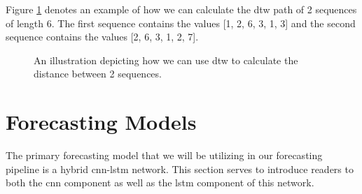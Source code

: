 \noindent Figure \ref{fig:DTW-Illustration} denotes an example of how we can calculate the \gls{dtw} path of 2 sequences of length 6. The first sequence contains the values [1, 2, 6, 3, 1, 3] and the second sequence contains the values [2, 6, 3, 1, 2, 7].

\begin{figure}[hbt!]
        \begin{adjustwidth*}{-0.5cm}{-0.5cm}%
                \myfloatalign
                 \quad
                 \quad
                \caption{An illustration depicting how we can use \gls{dtw} to calculate the distance between 2 sequences.}
                \label{fig:DTW-Illustration}
        \end{adjustwidth*}
\end{figure}

\section{Forecasting Models}
\label{sec:Background-Information:Forecasting-Models}
The primary forecasting model that we will be utilizing in our forecasting pipeline is a hybrid \gls{cnn-lstm} network. This section serves to introduce readers to both the \gls{cnn} component as well as the \gls{lstm} component of this network.

